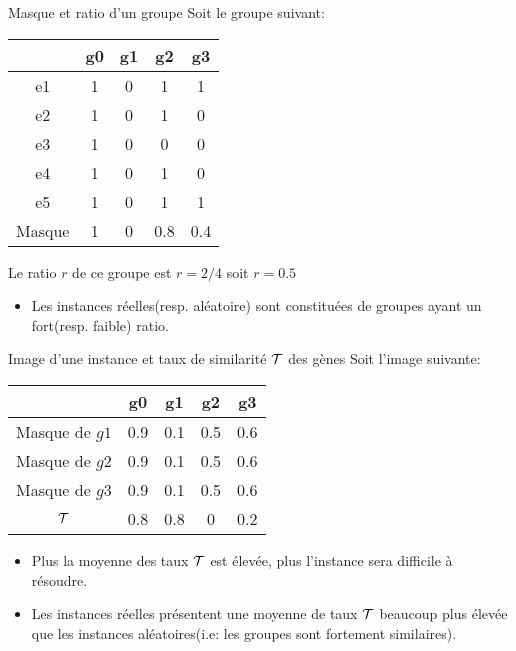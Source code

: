 \documentclass{beamer}
\begin{document}
\begin{frame}
	\begin{exampleblock}{Masque et ratio d'un groupe}
	Soit le groupe suivant:
		\begin{center}
			\begin{tabular}{|c|c|c|c|c|}
			\hline 
			\backslashbox{Entités}{Gènes} & g0 & g1 & g2 & g3 \\ 
			\hline 
			e1 & 1 & 0 & 1 & 1 \\
			\hline 
			e2 & 1 & 0 & 1 & 0 \\ 
			\hline 
			e3 & 1 & 0 & 0 & 0 \\ 
			\hline 
			e4 & 1 & 0 & 1 & 0 \\ 
			\hline 
			e5 & 1 & 0 & 1 & 1 \\ 
			\hline 
			\hline
			Masque & 1 & 0 & 0.8 & 0.4 \\
			\hline
			\end{tabular}
		\end{center}
	\pause
	Le ratio $r$ de ce groupe est $r=2/4$ soit $r=0.5$
	\end{exampleblock}
	
	\pause
		\begin{itemize}
			\item Les instances réelles(resp. aléatoire) sont constituées de groupes ayant un fort(resp. faible) ratio.
		\end{itemize}
\end{frame}

\begin{frame}
	\begin{exampleblock}{Image d'une instance et taux de similarité $\cal{T}$ des gènes}
	Soit l'image suivante:
		\begin{center}
			\begin{tabular}{|c|c|c|c|c|}
			\hline 
			\backslashbox{Groupes}{Gènes} & g0 & g1 & g2 & g3 \\ 
			\hline 
			Masque de $g1$ & 0.9 & 0.1 & 0.5 & 0.6 \\ 
			\hline 
			Masque de $g2$ & 0.9 & 0.1 & 0.5 & 0.6 \\
			\hline 
			Masque de $g3$ & 0.9 & 0.1 & 0.5 & 0.6 \\
			\hline 
			\hline
			$\cal{T}$ & 0.8 & 0.8 & 0 & 0.2 \\ 
			\hline
			\end{tabular}
		\end{center}
	\end{exampleblock}
	
	\pause
		\begin{itemize}
			\item Plus la moyenne des taux $\cal{T}$ est élevée, plus l'instance sera difficile à résoudre.
			\pause			
			\item Les instances réelles présentent une moyenne de taux $\cal{T}$ beaucoup plus élevée que les instances aléatoires(i.e: les groupes sont fortement similaires).
		\end{itemize}
\end{frame}
\end{document}

